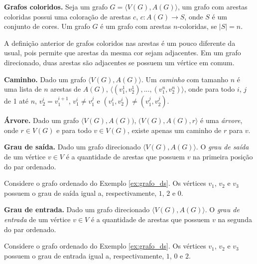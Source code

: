 \begin{definition}{\textbf{Grafos coloridos.}}
Seja um grafo $G = \langle V(G), A(G)\rangle$, um grafo com arestas coloridas possui uma coloração de arestas $c$, $c: A(G) \rightarrow S$, onde $S$ é um conjunto de cores. Um grafo $G$ é um grafo com arestas $n$-coloridas, se $|S| = n$.
\end{definition}

A definição anterior de grafos coloridos nas arestas é um pouco diferente da usual, pois permite que arestas da mesma cor sejam adjacentes. Em um grafo direcionado, duas arestas são adjacentes se possuem um vértice em comum.

\begin{definition}{\textbf{Caminho.}}
Dado um grafo $\langle V(G), A(G)\rangle$. Um \textit{caminho} com tamanho $n$ é uma lista de $n$ arestas de $A(G)$, $\langle (v^1_1, v^1_2), ..., (v^n_1, v^n_2)\rangle$, onde para todo $i$, $j$ de 1 até $n$, $v^i_2 = v^{i+1}_1$, $v^i_1 \neq v^j_1$ e $(v^i_1, v^i_2) \neq (v^j_1, v^j_2)$.
\end{definition}

\begin{definition}{\textbf{Árvore.}}
Dado um grafo $\langle V(G), A(G))$, $(V(G), A(G), r\rangle$ é uma \textit{árvore}, onde $r \in V(G)$ e para todo $v \in V(G)$, existe apenas um caminho de $r$ para $v$. 
\end{definition}

\begin{definition}{\textbf{Grau de saída.}}
Dado um grafo direcionado $\langle V(G), A(G)\rangle$. O \textit{grau de saída} de um vértice $v \in V$ é a quantidade de arestas que possuem $v$ na primeira posição do par ordenado.
\end{definition}

\begin{example}
Considere o grafo ordenado do Exemplo \ref{ex:grafo_ds}. Os vértices $v_1$, $v_2$ e $v_3$ possuem o grau de saída igual a, respectivamente, $1$, $2$ e $0$.
\end{example}

\begin{definition}{\textbf{Grau de entrada.}}
Dado um grafo direcionado $\langle V(G), A(G)\rangle$. O \textit{grau de entrada} de um vértice $v \in V$ é a quantidade de arestas que possuem $v$ na segunda do par ordenado.
\end{definition}

\begin{example}
Considere o grafo ordenado do Exemplo \ref{ex:grafo_ds}. Os vértices $v_1$, $v_2$ e $v_3$ possuem o grau de entrada igual a, respectivamente, $1$, $0$ e $2$.
\end{example}

